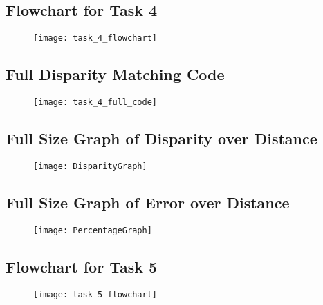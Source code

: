 \documentclass[conference]{IEEEtran}
\begin{document}
\begin{appendix}
 
\subsection{Flowchart for Task 4} \label{appendix:task_4_flowchart}

\begin{figure}[H]
\centerline{\texttt{[image: task\_4\_flowchart]}}
\end{figure}

\subsection{Full Disparity Matching Code} \label{appendix:task_4_disparity_code}

\begin{figure}[H]
\centerline{\texttt{[image: task\_4\_full\_code]}}
\end{figure}

\subsection{Full Size Graph of Disparity over Distance} \label{appendix:DisparityGraph}

\begin{figure}[H]
\centerline{\texttt{[image: DisparityGraph]}}
\end{figure}

\subsection{Full Size Graph of Error over Distance} \label{appendix:PercentageGraph}

\begin{figure}[H]
\centerline{\texttt{[image: PercentageGraph]}}
\end{figure}

\subsection{Flowchart for Task 5} \label{appendix:task_5_flowchart}

\begin{figure}[H]
\centerline{\texttt{[image: task\_5\_flowchart]}}
\end{figure}


\end{appendix}
\end{document}
